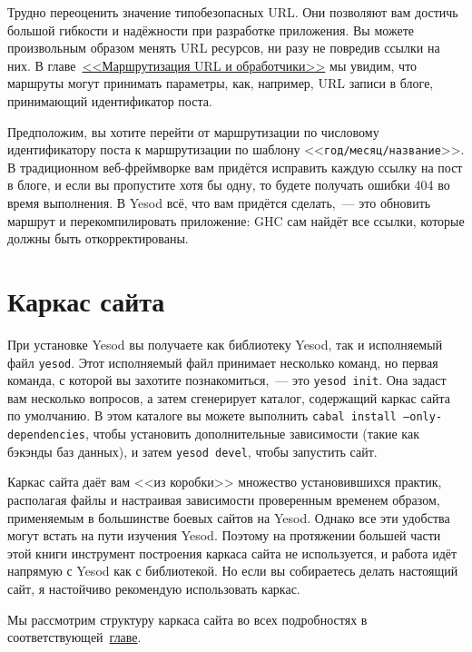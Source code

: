 Трудно переоценить значение типобезопасных URL. Они позволяют вам достичь
большой гибкости и надёжности при разработке приложения. Вы можете произвольным
образом менять URL ресурсов, ни разу не повредив ссылки на них. В
главе~\hyperref[chap:routing]{<<Маршрутизация URL и обработчики>>} мы увидим,
что маршруты могут принимать параметры, как, например, URL записи в блоге,
принимающий идентификатор поста.

Предположим, вы хотите перейти от маршрутизации по числовому идентификатору
поста к маршрутизации по шаблону <<\texttt{год/месяц/название}>>. В
традиционном веб-фреймворке вам придётся исправить каждую ссылку на пост в
блоге, и если вы пропустите хотя бы одну, то будете получать ошибки 404 во
время выполнения. В Yesod всё, что вам придётся сделать,~--- это обновить
маршрут и перекомпилировать приложение: GHC сам найдёт все ссылки, которые
должны быть откорректированы.

\section{Каркас сайта}

При установке Yesod вы получаете как библиотеку Yesod, так и исполняемый файл
\texttt{yesod}. Этот исполняемый файл принимает несколько команд, но первая
команда, с которой вы захотите познакомиться,~--- это \texttt{yesod init}. Она
задаст вам несколько вопросов, а затем сгенерирует каталог, содержащий каркас
сайта по умолчанию. В этом каталоге вы можете выполнить \texttt{cabal install
    --only-dependencies}, чтобы установить дополнительные зависимости (такие
как бэкэнды баз данных), и затем \texttt{yesod devel}, чтобы запустить сайт.

Каркас сайта даёт вам <<из коробки>> множество установившихся практик,
располагая файлы и настраивая зависимости проверенным временем образом,
применяемым в большинстве боевых сайтов на Yesod. Однако все эти удобства могут
встать на пути изучения Yesod. Поэтому на протяжении большей части этой книги
инструмент построения каркаса сайта не используется, и работа идёт напрямую с
Yesod как с библиотекой. Но если вы собираетесь делать настоящий сайт, я
настойчиво рекомендую использовать каркас.

Мы рассмотрим структуру каркаса сайта во всех подробностях в
соответствующей~\hyperref[chap:scaffolding]{главе}.

